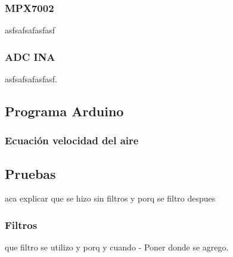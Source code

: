	
		
	
	\subsubsection{MPX7002}
	\begin{tcolorbox}[colback=blue!5!white,colframe=blue!75!black,title=Definición]
		asfsafsafasfasf
	\end{tcolorbox}

    \subsubsection{ADC INA}
	\begin{tcolorbox}[colback=blue!5!white,colframe=blue!75!black,title=Definición]
		asfsafsafasfasf.
	\end{tcolorbox}

    \subsection{Programa Arduino}
        \subsubsection{Ecuación velocidad del aire}
    \subsection{Pruebas}
    aca explicar que se hizo sin filtros y porq se filtro despues
        \subsubsection{Filtros}
        que filtro se utilizo y porq y cuando
    - Poner donde se agrego.

\newpage